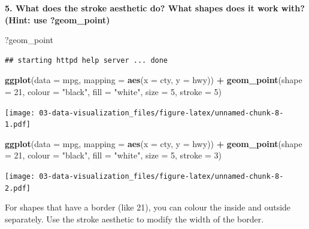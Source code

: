 \documentclass[]{book}
\newenvironment{Shaded}{\begin{snugshade}}{\end{snugshade}}
\newcommand{\DataTypeTok}[1]{\textcolor[rgb]{0.13,0.29,0.53}{#1}}
\newcommand{\DecValTok}[1]{\textcolor[rgb]{0.00,0.00,0.81}{#1}}
\newcommand{\KeywordTok}[1]{\textcolor[rgb]{0.13,0.29,0.53}{\textbf{#1}}}
\newcommand{\NormalTok}[1]{#1}
\newcommand{\OperatorTok}[1]{\textcolor[rgb]{0.81,0.36,0.00}{\textbf{#1}}}
\newcommand{\StringTok}[1]{\textcolor[rgb]{0.31,0.60,0.02}{#1}}
\theoremstyle{definition}
\theoremstyle{definition}
\theoremstyle{definition}
\theoremstyle{remark}
\begin{document}
\textbf{5. What does the stroke aesthetic do? What shapes does it work
with? (Hint: use ?geom\_point)}

\begin{Shaded}
\begin{Highlighting}[]
\NormalTok{?geom_point}
\end{Highlighting}
\end{Shaded}

\begin{verbatim}
## starting httpd help server ... done
\end{verbatim}

\begin{Shaded}
\begin{Highlighting}[]
\KeywordTok{ggplot}\NormalTok{(}\DataTypeTok{data =}\NormalTok{ mpg, }\DataTypeTok{mapping =} \KeywordTok{aes}\NormalTok{(}\DataTypeTok{x =}\NormalTok{ cty, }\DataTypeTok{y =}\NormalTok{ hwy)) }\OperatorTok{+}
\StringTok{  }\KeywordTok{geom_point}\NormalTok{(}\DataTypeTok{shape =} \DecValTok{21}\NormalTok{, }\DataTypeTok{colour =} \StringTok{"black"}\NormalTok{, }\DataTypeTok{fill =} \StringTok{"white"}\NormalTok{, }\DataTypeTok{size =} \DecValTok{5}\NormalTok{, }\DataTypeTok{stroke =} \DecValTok{5}\NormalTok{)}
\end{Highlighting}
\end{Shaded}

\texttt{[image: 03-data-visualization\_files/figure-latex/unnamed-chunk-8-1.pdf]}

\begin{Shaded}
\begin{Highlighting}[]
\KeywordTok{ggplot}\NormalTok{(}\DataTypeTok{data =}\NormalTok{ mpg, }\DataTypeTok{mapping =} \KeywordTok{aes}\NormalTok{(}\DataTypeTok{x =}\NormalTok{ cty, }\DataTypeTok{y =}\NormalTok{ hwy)) }\OperatorTok{+}
\StringTok{  }\KeywordTok{geom_point}\NormalTok{(}\DataTypeTok{shape =} \DecValTok{21}\NormalTok{, }\DataTypeTok{colour =} \StringTok{"black"}\NormalTok{, }\DataTypeTok{fill =} \StringTok{"white"}\NormalTok{, }\DataTypeTok{size =} \DecValTok{5}\NormalTok{, }\DataTypeTok{stroke =} \DecValTok{3}\NormalTok{)}
\end{Highlighting}
\end{Shaded}

\texttt{[image: 03-data-visualization\_files/figure-latex/unnamed-chunk-8-2.pdf]}

For shapes that have a border (like 21), you can colour the inside and
outside separately. Use the stroke aesthetic to modify the width of the
border.
\end{document}
